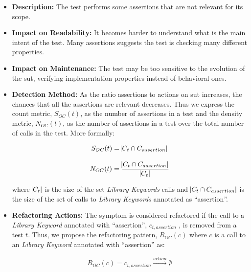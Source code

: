 \begin{itemize}
    \item \textbf{Description:} The test performs some assertions that are not relevant for its scope.

    \item \textbf{Impact on Readability:} It becomes harder to understand what is the main intent of the test. Many assertions suggests the test is checking many different properties.
    
    \item \textbf{Impact on Maintenance:} The test may be too sensitive to the evolution of the \gls{sut}, verifying implementation properties instead of behavioral ones.
    
    \item \textbf{Detection Method:} As the ratio assertions to actions on \gls{sut} increases, the chances that all the assertions are relevant decreases. Thus we express the count metric, $S_{OC}(t)$, as the number of assertions in a test and the density metric, $N_{OC}(t)$, as the number of assertions in a test over the total number of calls in the test. More formally:
    
    \begin{equation*}
        S_{OC}(t) = \abs{C_{t} \cap C_{assertion}}
    \end{equation*}
    
    \begin{equation*}
        N_{OC}(t) = \frac{ \abs{C_{t} \cap C_{assertion}}}{\abs{C_{t}}}
    \end{equation*}
    
    where $\abs{C_{t}}$ is the size of the set \emph{Library Keywords} calls and $\abs{C_{t} \cap C_{assertion}}$ is the size of the set of calls to \emph{Library Keywords} annotated as ``assertion''.
    
    \item \textbf{Refactoring Actions:} The symptom is considered refactored if the call to a \emph{Library Keyword} annotated with ``assertion'', $c_{t, assertion}$ , is removed from a test $t$. Thus, we propose the refactoring pattern, $R_{OC}(c)$ where $c$ is a call to an \emph{Library Keyword} annotated with ``assertion'' as:
    
    \begin{equation*}
        R_{OC}(c) = c_{t, assertion} \xrightarrow{action} \emptyset
    \end{equation*}
\end{itemize}

